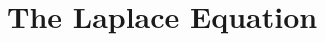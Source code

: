 \ifx\allfiles\undefined


	\else
	\fi
\chapter{The Laplace Equation}


	
	
















	\ifx\allfiles\undefined

\fi